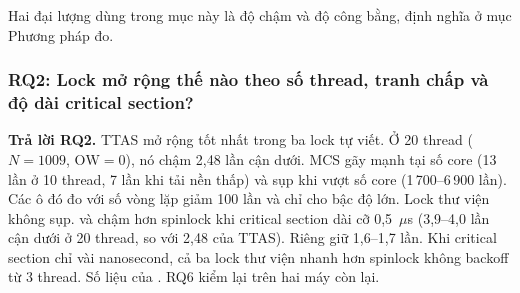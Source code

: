 
Hai đại lượng dùng trong mục này là độ chậm và độ công bằng, định nghĩa ở mục Phương pháp đo.

\subsubsection{RQ2: Lock mở rộng thế nào theo số thread, tranh chấp và độ dài critical section?}

\begin{rqanswer}\textbf{Trả lời RQ2.} TTAS mở rộng tốt nhất trong ba lock tự viết. Ở 20 thread
($N = 1009$, $\mathrm{OW} = 0$), nó chậm 2,48 lần cận dưới. MCS gãy mạnh tại số core (13 lần ở 10
thread, 7 lần khi tải nền thấp) và sụp khi vượt số core (1\,700--6\,900 lần). Các ô đó đo với số vòng lặp giảm 100 lần và chỉ cho bậc độ
lớn. Lock thư viện không sụp.  và  chậm hơn spinlock khi
critical section dài cỡ 0,5~$\mu$s (3,9--4,0 lần cận dưới ở 20 thread, so với 2,48 của TTAS). Riêng
 giữ 1,6--1,7 lần. Khi critical section chỉ vài nanosecond, cả ba lock thư viện
nhanh hơn spinlock không backoff từ 3 thread. Số liệu của . RQ6 kiểm lại trên hai máy còn lại.\end{rqanswer}

